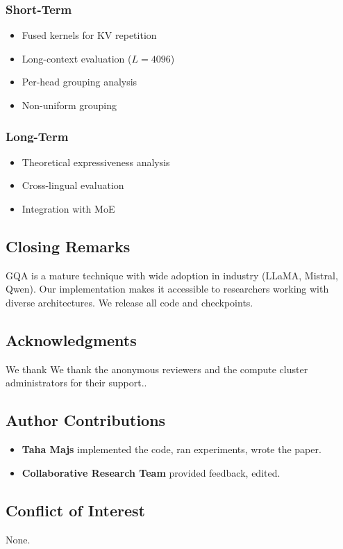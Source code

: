 \subsubsection{Short-Term}
\begin{itemize}
\item Fused kernels for KV repetition
\item Long-context evaluation ($L = 4096$)
\item Per-head grouping analysis
\item Non-uniform grouping

\end{itemize}
\subsubsection{Long-Term}
\begin{itemize}
\item Theoretical expressiveness analysis
\item Cross-lingual evaluation
\item Integration with MoE

\end{itemize}
\subsection{Closing Remarks}

GQA is a mature technique with wide adoption in industry (LLaMA, Mistral, 
Qwen). Our implementation makes it accessible to researchers working with 
diverse architectures. We release all code and checkpoints.

\subsection{Acknowledgments}

We thank We thank the anonymous reviewers and the compute cluster administrators for their support..

\subsection{Author Contributions}

\begin{itemize}
\item \textbf{Taha Majs} implemented the code, ran experiments, wrote the paper.
\item \textbf{Collaborative Research Team} provided feedback, edited.

\end{itemize}
\subsection{Conflict of Interest}

None.